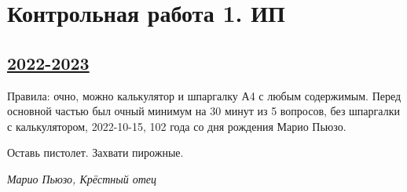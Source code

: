 \newpage
\thispagestyle{empty}
\section{Контрольная работа 1. ИП}


\subsection[2022-2023]{\hyperref[sec:sol_kr_01_ip_2022_2023]{2022-2023}}
\label{sec:kr_01_ip_2022_2023}

Правила: очно, можно калькулятор и шпаргалку А4 с любым содержимым. 
Перед основной частью был очный минимум на 30 минут из 5 вопросов, без шпаргалки с калькулятором, 2022-10-15, 
102 года со дня рождения Марио Пьюзо.

  \begin{center}
      Оставь пистолет. Захвати пирожные. 
  \end{center}
  \begin{flushright}
      \textit{Марио Пьюзо, Крёстный отец}
  \end{flushright}
  

